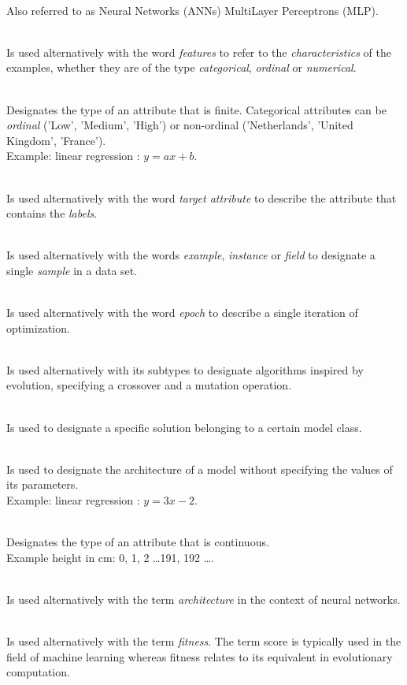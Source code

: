 \documentclass[a4paper,12pt, oneside]{memoir}
\begin{document}
\begin{description}
     \setlength\itemsep{0.001em}
     \item  [Artificial Neural Networks] \hfill \\
      Also referred to as Neural Networks (ANNs) MultiLayer Perceptrons (MLP).
     \item  [Attributes] \hfill \\
      Is used alternatively with the word \textit{features} to refer to the \textit{characteristics} of the examples, whether they are of the type \textit{categorical}, \textit{ordinal} or \textit{numerical}.  
     \item  [Categorical] \hfill \\
      Designates the type of an attribute that is finite. Categorical attributes can be \textit{ordinal} ('Low', 'Medium', 'High') or non-ordinal ('Netherlands', 'United Kingdom', 'France'). \\
      Example: linear regression : $y = ax + b$.
     \item  [Class attribute] \hfill \\
      Is used alternatively with the word \textit{target attribute} to describe the attribute that contains the \textit{labels}.
     \item  [Data object] \hfill \\
      Is used alternatively with the words \textit{example}, \textit{instance} or \textit{field} to designate a single \textit{sample} in a data set.
     \item  [Generation] \hfill \\
      Is used alternatively with the word \textit{epoch} to describe a single iteration of optimization.
     \item  [Genetic Algorithms] \hfill \\
      Is used alternatively with its subtypes to designate algorithms inspired by evolution, specifying a crossover and a mutation operation. 
     \item  [Model] \hfill \\
      Is used to designate a specific solution belonging to a certain model class.
     \item  [Model class] \hfill \\
      Is used to designate the architecture of a model without specifying the values of its parameters. \\
      Example: linear regression : $y = 3x - 2$.
     \item  [Numerical] \hfill \\
      Designates the type of an attribute that is continuous. \\
      Example height in cm: 0, 1, 2 \dots 191, 192 \dots.
     \item  [Topology] \hfill \\
      Is used alternatively with the term \textit{architecture} in the context of neural networks.
    \item  [Score] \hfill \\
      Is used alternatively with the term \textit{fitness}. The term score is typically used in the field of machine learning whereas fitness relates to its equivalent in evolutionary computation.


\end{description}
\end{document}
